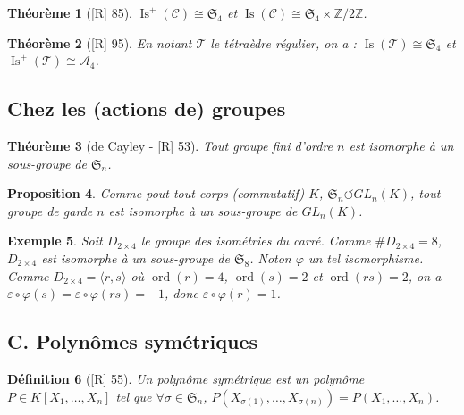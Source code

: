 \documentclass[10pt, a4paper, parskip=full, twoside, twocolumn]{report}
\newtheorem{definition}{Définition}
\newtheorem{theorem}[definition]{Théorème}
\newtheorem{proposition}[definition]{Proposition}
\newtheorem{example}[definition]{Exemple}
\newcommand{\IZ}{\mathbb{Z}}
\newcommand{\actson}{\circlearrowleft}
\DeclareMathOperator{\Is}{Is}
\DeclareMathOperator{\ord}{ord}
\begin{document}
\begin{tcolorbox}[
    breakable, %
    colback=developpement, %
    colframe=gray!0!black, %
    boxrule=0pt, %
    arc=1mm, %
	boxsep=0pt,
	left=0pt, right=0pt, top=0pt, bottom=0pt
]
\begin{theorem}[\textnormal{[R] 85}]
	\label{105dev1}
	$\Is^+(\mathcal{C}) \cong \mathfrak{S}_4$ et $\Is(\mathcal{C})\cong \mathfrak{S}_4\times \IZ/2\IZ$.
\end{theorem}
\end{tcolorbox}

\begin{theorem}[\textnormal{[R] 95}]
	En notant $\mathcal{T}$ le tétraèdre régulier, on a :
	$\Is(\mathcal{T})\cong \mathfrak{S}_4$ et $\Is^+(\mathcal{T})\cong \mathcal{A}_4$.
\end{theorem}

\subsection*{Chez les (actions de) groupes}
\begin{theorem}[de Cayley - \textnormal{[R] 53}]
	Tout groupe fini d'ordre $n$ est isomorphe à un sous-groupe de $\mathfrak{S}_n$.
\end{theorem}
\begin{proposition}
	Comme pout tout corps (commutatif) $K$, $\mathfrak{S}_n\actson GL_n(K)$, tout groupe de garde $n$ 
	est isomorphe à un sous-groupe de $GL_n(K)$.
\end{proposition}

\begin{example}
	Soit $D_{2\times 4}$ le groupe des isométries du carré. Comme $\#D_{2\times 4} = 8$, $D_{2\times 4}$ est isomorphe à un sous-groupe de $\mathfrak{S}_8$. Noton $\varphi$ un tel isomorphisme.
	Comme $D_{2\times 4} = \langle r, s\rangle$ où $\ord(r) = 4$, $\ord(s) = 2$ et $\ord(rs) = 2$, on a $\varepsilon\circ \varphi(s)=\varepsilon\circ \varphi(rs) = -1$, donc $\varepsilon\circ \varphi(r) = 1$.
\end{example}

\subsection*{C. Polynômes symétriques}
\begin{definition}[\textnormal{[R] 55}]
	Un \emph{polynôme symétrique} est un polynôme $P\in K[X_1,\dots,X_n]$
	tel que $\forall\sigma\in\mathfrak{S}_n$, $P(X_{\sigma(1)},\dots,X_{\sigma(n)}) = P(X_1,\dots,X_n)$.
\end{definition}
\end{document}
